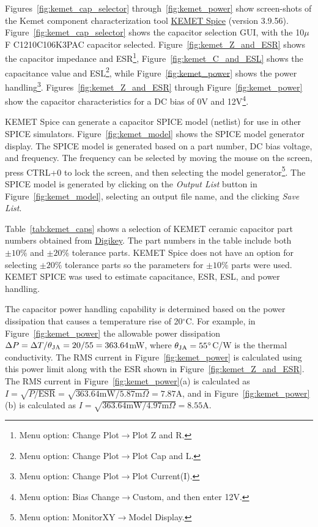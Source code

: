 \documentclass[10pt,twoside]{article}
\begin{document}
Figures~\ref{fig:kemet_cap_selector} through~\ref{fig:kemet_power}
show screen-shots of the Kemet component characterization tool
\href{http://www.kemet.com/kemet/web/homepage/kechome.nsf/weben/kemsoft}
{KEMET Spice} (version 3.9.56). 
Figure~\ref{fig:kemet_cap_selector} shows the capacitor selection
GUI, with the 10$\mu$F C1210C106K3PAC capacitor selected.
Figure~\ref{fig:kemet_Z_and_ESR} shows the capacitor impedance and 
ESR\footnote{Menu option: Change Plot$\rightarrow$Plot Z and R.},
Figure~\ref{fig:kemet_C_and_ESL} shows the capacitance value and 
ESL\footnote{Menu option: Change Plot$\rightarrow$Plot Cap and L.},
while Figure~\ref{fig:kemet_power} shows the power 
handling\footnote{Menu option: Change Plot$\rightarrow$Plot Current(I).}.
%
Figures~\ref{fig:kemet_Z_and_ESR} through Figure~\ref{fig:kemet_power}
show the capacitor characteristics for a DC bias of 0V and 
12V\footnote{Menu option: Bias Change$\rightarrow$Custom, and
then enter 12V.}.

KEMET Spice can generate a capacitor SPICE model (netlist) for use in other
SPICE simulators. Figure~\ref{fig:kemet_model} shows the SPICE model
generator display. The SPICE model is generated based on a part 
number, DC bias voltage, and frequency. The frequency can be selected
by moving the mouse on the screen, press CTRL+0 to lock the screen,
and then selecting the model generator\footnote{Menu option:
MonitorXY$\rightarrow$Model Display.}. The SPICE model is
generated by clicking on the {\em Output List} button in
Figure~\ref{fig:kemet_model}, selecting an output file name, and
the clicking {\em Save List}.

Table~\ref{tab:kemet_caps} shows a selection of KEMET ceramic capacitor
part numbers obtained from \href{http://www.digikey.com}{Digikey}.
The part numbers in the table include both $\pm10\%$ and $\pm20\%$
tolerance parts. KEMET Spice does not have an option for selecting 
$\pm20\%$ tolerance parts so the parameters for $\pm10\%$ parts were used.
KEMET SPICE was used to estimate capacitance, ESR, ESL, and power handling.

The capacitor power handling capability is determined based on
the power dissipation that causes a temperature rise of 20$^\circ$C.
For example, in Figure~\ref{fig:kemet_power} the allowable power dissipation
$\Delta P = \Delta T/\theta_{\rm JA} = 20/55 = 363.64$mW, where
$\theta_{\rm JA} = 55^\circ$C/W is the thermal conductivity.
The RMS current in Figure~\ref{fig:kemet_power} is calculated using
this power limit along with the ESR shown in Figure~\ref{fig:kemet_Z_and_ESR}.
The RMS current in Figure~\ref{fig:kemet_power}(a) is calculated as
$I = \sqrt{P/\text{ESR}} = \sqrt{363.64\text{mW}/5.87\text{m}\Omega} = 7.87$A,
and in Figure~\ref{fig:kemet_power}(b) is calculated as
$I = \sqrt{363.64\text{mW}/4.97\text{m}\Omega} = 8.55$A.
\end{document}
